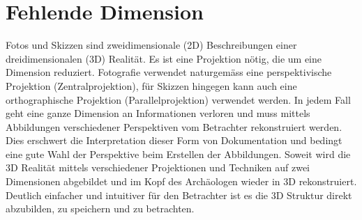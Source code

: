 			
	\section{Fehlende Dimension}
		Fotos und Skizzen sind zweidimensionale (2D) Beschreibungen einer dreidimensionalen (3D) Realität. Es ist eine Projektion nötig, die um eine Dimension reduziert. Fotografie verwendet naturgemäss eine perspektivische Projektion (Zentralprojektion), für Skizzen hingegen kann auch eine orthographische Projektion (Parallelprojektion) verwendet werden.
		In jedem Fall geht eine ganze Dimension an Informationen verloren und muss mittels Abbildungen verschiedener Perspektiven vom Betrachter rekonstruiert werden.
		Dies erschwert die Interpretation dieser Form von Dokumentation und bedingt eine gute Wahl der Perspektive beim Erstellen der Abbildungen.
		Soweit wird die 3D Realität mittels verschiedener Projektionen und Techniken auf zwei Dimensionen abgebildet und im Kopf des Archäologen wieder in 3D rekonstruiert.
		Deutlich einfacher und intuitiver für den Betrachter ist es die 3D Struktur direkt abzubilden, zu speichern und zu betrachten.